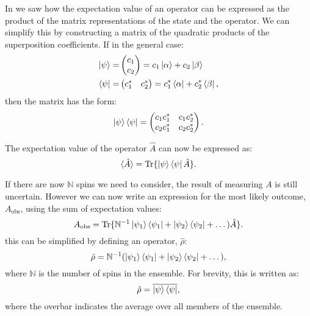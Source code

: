 In  we saw how the expectation value of an operator can be expressed as
the product of the matrix representations of the state and the operator. We can simplify this by
constructing a matrix of the quadratic products of the superposition coefficients. If in the
general case:
\begin{align}
\ket{\psi} =& \begin{pmatrix}
    c_1\\
    c_2
\end{pmatrix} = c_1\ket{\alpha} + c_2\ket{\beta}\\
\bra{\psi} =& \begin{pmatrix}
  c_1^* & c_2^*
\end{pmatrix} = c_1^*\bra{\alpha} + c_2^*\bra{\beta},
\end{align}
then the matrix has the form:
\begin{equation}
\ket{\psi}\bra{\psi} = \begin{pmatrix}
    {c_1c_1^*} & {c_1c_2^*}\\
    {c_2c_1^*} & {c_2c_2^*}
\end{pmatrix}.
\end{equation}

The expectation value of the operator $\hat{A}$ can now be expressed as:
\begin{equation}
  \langle\hat{A}\rangle = \text{Tr}\{\ket{\psi}\bra{\psi}\hat{A}\}.
\end{equation}

If there are now $\mathbb{N}$ spins we need to consider, the
result of measuring $A$ is still uncertain. However we can now write an expression for the most likely outcome,
$A_{\text{obs}}$, using the sum of expectation values:
\begin{equation}
  A_{\text{obs}} = \text{Tr}\{\mathbb{N}^{-1}\ket{\psi_1}\bra{\psi_1}+\ket{\psi_2}\bra{\psi_2}+\dots)\hat{A}\}.
\end{equation}
this can be simplified by defining an operator, $\hat{\rho}$:
\begin{equation}
  \hat{\rho} = \mathbb{N}^{-1}(\ket{\psi_1}\bra{\psi_1}+\ket{\psi_2}\bra{\psi_2}+\dots),
\end{equation}
where $\mathbb{N}$ is the number of spins in the ensemble. For brevity,
this is written as:
\begin{equation}
  \hat{\rho} = \overline{\ket{\psi}\bra{\psi}},
\end{equation}
where the overbar indicates the average over all members of the ensemble.

